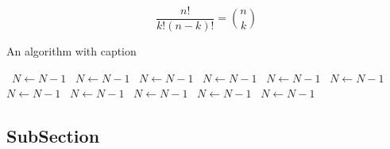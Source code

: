 \documentclass[a4paper]{article}
\begin{document}
\[ \frac{n!}{k!(n-k)!} = \binom{n}{k} \]

\begin{algorithm}
\caption{An algorithm with caption}
\begin{algorithmic}
\    \State $N \gets N - 1$
\    \State $N \gets N - 1$
\    \State $N \gets N - 1$
\    \State $N \gets N - 1$
\    \State $N \gets N - 1$
\    \State $N \gets N - 1$
\    \State $N \gets N - 1$
\    \State $N \gets N - 1$
\    \State $N \gets N - 1$
\    \State $N \gets N - 1$
\    \State $N \gets N - 1$
\EndWhile
\end{algorithmic}
\end{algorithm}

\subsection{SubSection}
\end{document}
